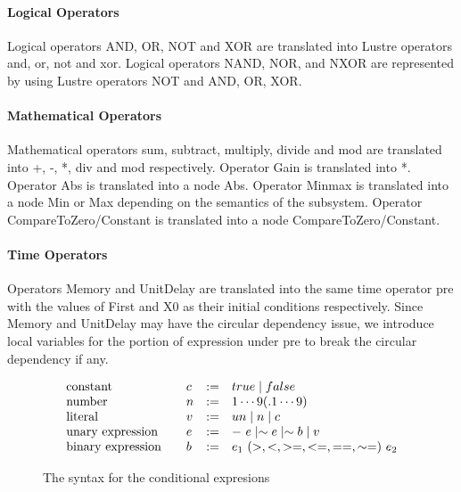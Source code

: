 \documentclass{article}
\begin{document}
\paragraph{Logical Operators} 
Logical operators \textsf{AND, OR, NOT} and \textsf{XOR} are translated into Lustre operators 
\textsf{and, or, not} and \textsf{xor}.
Logical operators \textsf{NAND, NOR}, and \textsf{NXOR} are represented by using Lustre 
operators \textsf{NOT} and \textsf{AND, OR, XOR}.

\paragraph{Mathematical Operators} 
Mathematical operators sum, subtract, multiply, divide and mod are translated into 
\textsf{+}, \textsf{-}, \textsf{*}, \textsf{div} and \textsf{mod} respectively.
Operator Gain is translated into \textsf{*}. 
Operator Abs is translated into a node Abs. 
Operator Minmax is translated into a node Min or Max depending on the semantics of the subsystem. 
Operator CompareToZero/Constant is translated into a node CompareToZero/Constant.

\paragraph{Time Operators}
Operators Memory and UnitDelay are translated into the same time operator \textsf{pre} with the 
values of First and X0 as their initial conditions respectively.
Since Memory and UnitDelay may have the circular dependency issue, we introduce local variables for the 
portion of expression under \textsf{pre} to break the circular dependency if any. 

\begin{figure}[t]
\[
\begin{array}{l@{\qquad}llll}
 \text{constant} & c & := & 
true \mid false
 \\[0ex]
 \text{number} & n & := & 
 1 \cdots 9 (.1 \cdots 9)
 \\[0ex]
  \text{literal} & v & := & 
u n \mid n \mid c
 \\[0ex]
\text{unary expression} & e & := & 
-\ e \mid \sim e \mid \sim b \mid v
 \\[0ex]
 \text{binary expression} & b & := & 
e_1\ (>, <, >=, <=, ==, \sim=)\ e_2 
 \\[0ex]
\end{array}       
\]
\caption{The syntax for the conditional expresions}
\label{fig:grammar}
\end{figure}
\end{document}

